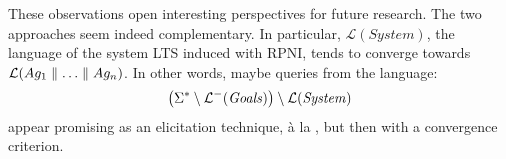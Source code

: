 These observations open interesting perspectives for future research. The two approaches seem indeed complementary. In particular, $\mathcal{L}(System)$, the language of the system LTS induced with RPNI, tends to converge towards $\mathcal{L}(Ag_1 \parallel \ldots \parallel Ag_n)$. In other words, maybe queries from the language:
\begin{align*}
\left( \Sigma^* \setminus \mathcal{L}^-(\mbox{\emph{Goals}}) \right) \setminus \mathcal{L}(\mbox{\emph{System}})
\end{align*}
appear promising as an elicitation technique, \`a la \cite{Uchitel:2007, Uchitel:2009}, but then with a convergence criterion.
